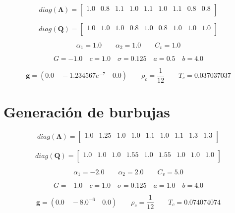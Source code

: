 \begin{equation}
	diag(\mathbf{\Lambda}) = 
	\begin{bmatrix}
		1.0 & 0.8 & 1.1 & 1.0 & 1.1 & 1.0 & 1.1 & 0.8 & 0.8 \\
	\end{bmatrix}
\end{equation}

\begin{equation}
diag(\mathbf{Q}) = 
	\begin{bmatrix}
		1.0 & 1.0 & 1.0 & 0.8 & 1.0 & 0.8 & 1.0 & 1.0 & 1.0 \\
	\end{bmatrix}
\end{equation}

\begin{equation}
	\alpha_{1} = 1.0 \qquad 	\alpha_{2} = 1.0 \qquad C_{v} = 1.0
\end{equation}

\begin{equation}
	G = -1.0 \quad c = 1.0 \quad \sigma = 0.125 \quad a = 0.5 \quad b = 4.0 
\end{equation}

\begin{equation}
\mathbf{g} = (0.0 \quad-1.234567e^{-7}\quad 0.0 ) \qquad \rho_c = \frac{1}{12} \qquad T_c = 0.037037037
\end{equation}

\section{Generación de burbujas}
\label{parametros_bub}

\begin{equation}
	diag(\mathbf{\Lambda}) = 
		\begin{bmatrix}
			1.0 & 1.25 & 1.0 & 1.0 & 1.1 & 1.0 & 1.1 & 1.3 & 1.3 \\
		\end{bmatrix}
\end{equation}

\begin{equation}
diag(\mathbf{Q}) = 
\begin{bmatrix}
1.0 & 1.0 & 1.0 & 1.55 & 1.0 & 1.55 & 1.0 & 1.0 & 1.0 \\
\end{bmatrix}
\end{equation}

\begin{equation}
\alpha_{1} = -2.0 \qquad 	\alpha_{2} = 2.0 \qquad C_{v} = 5.0
\end{equation}


\begin{equation}
G = -1.0 \quad c = 1.0 \quad \sigma = 0.125 \quad a = 1.0 \quad b = 4.0 
\end{equation}

\begin{equation}
\mathbf{g} = (0.0 \quad -8.0^{-6} \quad 0.0 ) \qquad \rho_c = \frac{1}{12} \qquad T_c = 0.074074074
\end{equation}